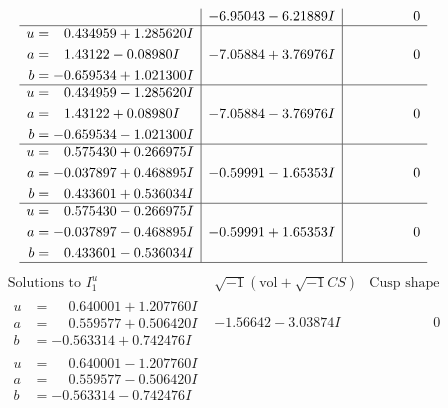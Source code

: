 \documentclass[1p]{elsarticle_modified}
\theoremstyle{definition}
\newcommand{\I}{\sqrt{-1}}
\begin{document}
$$\begin{array}{c|c|c}
 & -6.95043 - 6.21889 I & \phantom{-0.000000 } 0 \\ \hline\begin{aligned}
u &= \phantom{-}0.434959 + 1.285620 I \\
a &= \phantom{-}1.43122 - 0.08980 I \\
b &= -0.659534 + 1.021300 I\end{aligned}
 & -7.05884 + 3.76976 I & \phantom{-0.000000 } 0 \\ \hline\begin{aligned}
u &= \phantom{-}0.434959 - 1.285620 I \\
a &= \phantom{-}1.43122 + 0.08980 I \\
b &= -0.659534 - 1.021300 I\end{aligned}
 & -7.05884 - 3.76976 I & \phantom{-0.000000 } 0 \\ \hline\begin{aligned}
u &= \phantom{-}0.575430 + 0.266975 I \\
a &= -0.037897 + 0.468895 I \\
b &= \phantom{-}0.433601 + 0.536034 I\end{aligned}
 & -0.59991 - 1.65353 I & \phantom{-0.000000 } 0 \\ \hline\begin{aligned}
u &= \phantom{-}0.575430 - 0.266975 I \\
a &= -0.037897 - 0.468895 I \\
b &= \phantom{-}0.433601 - 0.536034 I\end{aligned}
 & -0.59991 + 1.65353 I & \phantom{-0.000000 } 0\\
 \hline 
 \end{array}$$\newpage$$\begin{array}{c|c|c}  
\text{Solutions to }I^u_{1}& \I (\text{vol} + \sqrt{-1}CS) & \text{Cusp shape}\\
 \hline 
\begin{aligned}
u &= \phantom{-}0.640001 + 1.207760 I \\
a &= \phantom{-}0.559577 + 0.506420 I \\
b &= -0.563314 + 0.742476 I\end{aligned}
 & -1.56642 - 3.03874 I & \phantom{-0.000000 } 0 \\ \hline\begin{aligned}
u &= \phantom{-}0.640001 - 1.207760 I \\
a &= \phantom{-}0.559577 - 0.506420 I \\
b &= -0.563314 - 0.742476 I\end{aligned}

\end{array}$$
\end{document}
